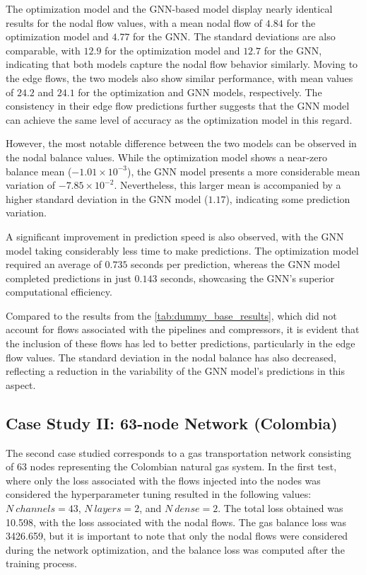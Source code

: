 The optimization model and the GNN-based model display nearly identical results for the nodal flow values, with a mean nodal flow of $4.84$ for the optimization model and $4.77$ for the GNN. The standard deviations are also comparable, with $12.9$ for the optimization model and $12.7$ for the GNN, indicating that both models capture the nodal flow behavior similarly. Moving to the edge flows, the two models also show similar performance, with mean values of $24.2$ and $24.1$ for the optimization and GNN models, respectively. The consistency in their edge flow predictions further suggests that the GNN model can achieve the same level of accuracy as the optimization model in this regard.

However, the most notable difference between the two models can be observed in the nodal balance values. While the optimization model shows a near-zero balance mean ($-1.01 \times 10^{-3}$), the GNN model presents a more considerable mean variation of $-7.85 \times 10^{-2}$. Nevertheless, this larger mean is accompanied by a higher standard deviation in the GNN model ($1.17$), indicating some prediction variation. 

A significant improvement in prediction speed is also observed, with the GNN model taking considerably less time to make predictions. The optimization model required an average of $0.735$ seconds per prediction, whereas the GNN model completed predictions in just $0.143$ seconds, showcasing the GNN's superior computational efficiency.

Compared to the results from the \cref{tab:dummy_base_results}, which did not account for flows associated with the pipelines and compressors, it is evident that the inclusion of these flows has led to better predictions, particularly in the edge flow values. The standard deviation in the nodal balance has also decreased, reflecting a reduction in the variability of the GNN model's predictions in this aspect. 





\subsection{Case Study II: 63-node Network (Colombia)}


The second case studied corresponds to a gas transportation network consisting of 63 nodes representing the Colombian natural gas system. In the first test, where only the loss associated with the flows injected into the nodes was considered the hyperparameter tuning resulted in the following values: $N \ channels = 43$, $N \ layers = 2$, and $N \ dense = 2$. The total loss obtained was 10.598, with the loss associated with the nodal flows. The gas balance loss was 3426.659, but it is important to note that only the nodal flows were considered during the network optimization, and the balance loss was computed after the training process.

